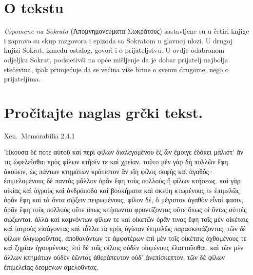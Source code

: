 


\section*{O tekstu}

\textit{Uspomene na Sokrata} \textgreek[variant=ancient]{(Ἀπομνημονεύματα Σωκράτους)} sastavljene su u četiri knjige i zapravo su skup razgovora i epizoda sa Sokratom u glavnoj ulozi. U drugoj knjizi Sokrat, između ostalog, govori i o prijateljstvu. U ovdje odabranom odjeljku Sokrat, podsjetivši na opće mišljenje da je dobar prijatelj najbolja stečevina, ipak primjećuje da se većina više brine o svemu drugome, nego o prijateljima.


\section*{Pročitajte naglas grčki tekst.}


Xen.\ Memorabilia 2.4.1

\medskip

{\large
\begin{greek}
\noindent  Ἤκουσα δέ ποτε αὐτοῦ καὶ περὶ φίλων διαλεγομένου ἐξ ὧν ἔμοιγε ἐδόκει μάλιστ' ἄν τις ὠφελεῖσθαι πρὸς φίλων κτῆσίν τε καὶ χρείαν. τοῦτο μὲν γὰρ δὴ πολλῶν ἔφη ἀκούειν, ὡς πάντων κτημάτων κράτιστον ἂν εἴη φίλος σαφὴς καὶ ἀγαθός· ἐπιμελομένους δὲ παντὸς μᾶλλον ὁρᾶν ἔφη τοὺς πολλοὺς ἢ φίλων κτήσεως. καὶ γὰρ οἰκίας καὶ ἀγροὺς καὶ ἀνδράποδα καὶ βοσκήματα καὶ σκεύη κτωμένους τε ἐπιμελῶς ὁρᾶν ἔφη καὶ τὰ ὄντα σῴζειν πειρωμένους, φίλον δέ, ὃ μέγιστον ἀγαθὸν εἶναί φασιν, ὁρᾶν ἔφη τοὺς πολλοὺς οὔτε ὅπως κτήσωνται φροντίζοντας οὔτε ὅπως οἱ ὄντες αὐτοῖς σῴζωνται. ἀλλὰ καὶ καμνόντων φίλων τε καὶ οἰκετῶν ὁρᾶν τινας ἔφη τοῖς μὲν οἰκέταις καὶ ἰατροὺς εἰσάγοντας καὶ τἆλλα τὰ πρὸς ὑγίειαν ἐπιμελῶς παρασκευάζοντας, τῶν δὲ φίλων ὀλιγωροῦντας, ἀποθανόντων τε ἀμφοτέρων ἐπὶ μὲν τοῖς οἰκέταις ἀχθομένους τε καὶ ζημίαν ἡγουμένους, ἐπὶ δὲ τοῖς φίλοις οὐδὲν οἰομένους ἐλαττοῦσθαι, καὶ τῶν μὲν ἄλλων κτημάτων οὐδὲν ἐῶντας ἀθεράπευτον οὐδ' ἀνεπίσκεπτον, τῶν δὲ φίλων ἐπιμελείας δεομένων ἀμελοῦντας.
\end{greek}

}

